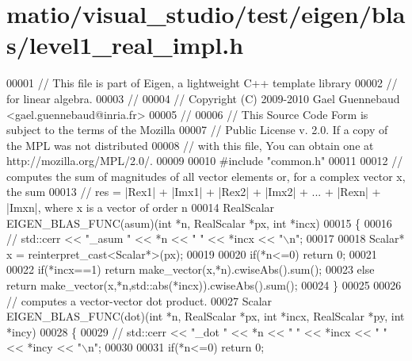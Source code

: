 \hypertarget{matio_2visual__studio_2test_2eigen_2blas_2level1__real__impl_8h_source}{}\section{matio/visual\+\_\+studio/test/eigen/blas/level1\+\_\+real\+\_\+impl.h}
\label{matio_2visual__studio_2test_2eigen_2blas_2level1__real__impl_8h_source}

\begin{DoxyCode}
00001 \textcolor{comment}{// This file is part of Eigen, a lightweight C++ template library}
00002 \textcolor{comment}{// for linear algebra.}
00003 \textcolor{comment}{//}
00004 \textcolor{comment}{// Copyright (C) 2009-2010 Gael Guennebaud <gael.guennebaud@inria.fr>}
00005 \textcolor{comment}{//}
00006 \textcolor{comment}{// This Source Code Form is subject to the terms of the Mozilla}
00007 \textcolor{comment}{// Public License v. 2.0. If a copy of the MPL was not distributed}
00008 \textcolor{comment}{// with this file, You can obtain one at http://mozilla.org/MPL/2.0/.}
00009 
00010 \textcolor{preprocessor}{#include "common.h"}
00011 
00012 \textcolor{comment}{// computes the sum of magnitudes of all vector elements or, for a complex vector x, the sum}
00013 \textcolor{comment}{// res = |Rex1| + |Imx1| + |Rex2| + |Imx2| + ... + |Rexn| + |Imxn|, where x is a vector of order n}
00014 RealScalar EIGEN\_BLAS\_FUNC(asum)(\textcolor{keywordtype}{int} *n, RealScalar *px, \textcolor{keywordtype}{int} *incx)
00015 \{
00016 \textcolor{comment}{//   std::cerr << "\_asum " << *n << " " << *incx << "\(\backslash\)n";}
00017 
00018   Scalar* x = \textcolor{keyword}{reinterpret\_cast<}Scalar*\textcolor{keyword}{>}(px);
00019 
00020   \textcolor{keywordflow}{if}(*n<=0) \textcolor{keywordflow}{return} 0;
00021 
00022   \textcolor{keywordflow}{if}(*incx==1)  \textcolor{keywordflow}{return} make\_vector(x,*n).cwiseAbs().sum();
00023   \textcolor{keywordflow}{else}          \textcolor{keywordflow}{return} make\_vector(x,*n,std::abs(*incx)).cwiseAbs().sum();
00024 \}
00025 
00026 \textcolor{comment}{// computes a vector-vector dot product.}
00027 Scalar EIGEN\_BLAS\_FUNC(dot)(\textcolor{keywordtype}{int} *n, RealScalar *px, \textcolor{keywordtype}{int} *incx, RealScalar *py, \textcolor{keywordtype}{int} *incy)
00028 \{
00029 \textcolor{comment}{//   std::cerr << "\_dot " << *n << " " << *incx << " " << *incy << "\(\backslash\)n";}
00030 
00031   \textcolor{keywordflow}{if}(*n<=0) \textcolor{keywordflow}{return} 0;

\end{DoxyCode}
